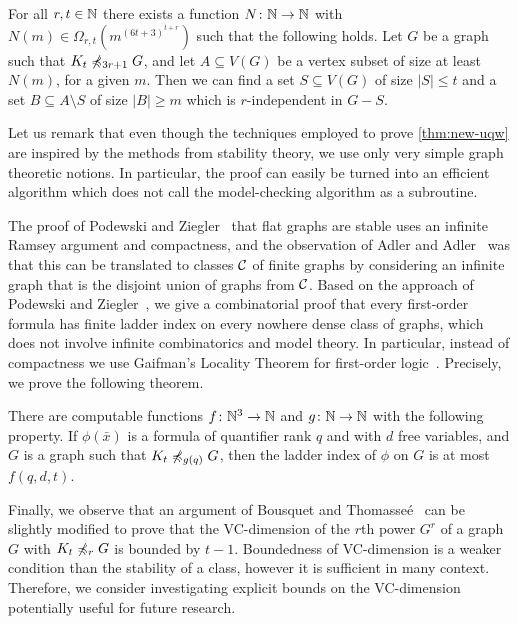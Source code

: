 \begin{theorem}\label{thm:new-uqw}
For all $r,t\in \mathbb{N}$ there exists a function $N\colon \mathbb{N}\to \mathbb{N}$ with $N(m)\in \Omega_{r,t}(m^{(6t+3)^{t+r}})$ such that the following holds.
Let $G$ be a graph such that $K_t\not\preccurlyeq_{3r+1} G$, and
let $A\subseteq V(G)$ be a vertex subset of size at least $N(m)$, for a given $m$.
Then we can find a set $S\subseteq V(G)$ of size $|S|\leq t$ and a set $B\subseteq A\setminus S$ 
of size $|B|\geq m$ which is $r$-independent in $G-S$.  
\end{theorem}

Let us remark
that even though the techniques employed to prove \cref{thm:new-uqw} are inspired by the methods from stability theory, 
we use only very simple graph theoretic notions. In particular, the
proof can easily be turned into an efficient algorithm which does not
call the model-checking algorithm as a subroutine. 

The proof of Podewski and Ziegler~\cite{podewski1978stable} that flat graphs are stable uses an 
infinite Ramsey argument and compactness, and the observation of Adler and Adler~\cite{adler2014interpreting} was that
this can be translated to classes $\mathcal{C}$ of finite graphs by considering an infinite graph that is the disjoint union of graphs from $\mathcal{C}$.
Based on the approach of Podewski and Ziegler~\cite{podewski1978stable}, we give a combinatorial 
proof that every first-order formula has finite ladder index on every
nowhere dense class of graphs, which does not involve infinite combinatorics and model theory.
In particular, instead of compactness we use Gaifman's Locality Theorem for
first-order logic~\cite{gaifman1982local}. Precisely, we prove the following theorem.

\begin{theorem}\label{thm:new-stable}
  There are computable functions $f\colon \mathbb{N}^3\to\mathbb{N}$ and $g\colon\mathbb{N}\to\mathbb{N}$ with the following property.
If $\phi(\bar x)$ is a formula of quantifier rank $q$ and with $d$ free variables,
and  $G$ is a graph such that $K_t\not\preccurlyeq_{g(q)} G$, then the ladder index of $\phi$ on $G$ is at most $f(q,d,t)$. 
\end{theorem}

Finally, we observe that an argument of Bousquet and 
Thomasse\'e~\cite{BousquetT15} can be slightly modified to prove that 
the VC-dimension of the $r$th power $G^r$ of a graph $G$
with $K_t\not\preccurlyeq_r G$ is bounded by $t-1$.
Boundedness of VC-dimension is a weaker condition than the stability of a class, however it is sufficient in many context.
Therefore, we consider investigating explicit bounds on the VC-dimension potentially useful for future research.


